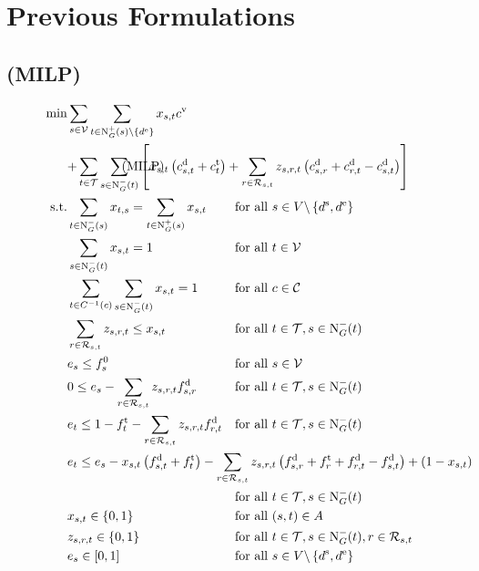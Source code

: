 \chapter{Previous Formulations}

\section{(MILP)}

\begin{align}
	\min & \sum_{s\in\mathcal{V}} \sum_{t\in\Nout(s)\backslash\{d^{\operatorname{e}}\}} x_{s,t}\cv \nonumber \\
	& \omit\rlap{$\displaystyle{ + \sum_{t\in\mathcal{T}} \sum_{s\in\Nin(t)} \left[x_{s,t}\left(\cd_{s,t}+\ct_{t}\right) + \sum_{r\in\Rst} z_{s,r,t}\left(\cd_{s,r}+\cd_{r,t}-\cd_{s,t}\right)\right]}$} \tag{MILP} \label{eq:MILP} \\
	\text{s.t.} & \sum_{t\in\Nin(s)} x_{t,s} = \sum_{t\in\Nout(s)} x_{s,t} & & \text{for all } s\in V\backslash\left\{d^{\operatorname{s}},d^{\operatorname{e}}\right\} \label{eq:MILP:flow} \\
	& \sum_{s\in\Nin(t)} x_{s,t} = 1 & & \text{for all } t\in\mathcal{V} \label{eq:MILP:vehicles} \\
	& \sum_{t\in C^{-1}(c)} \sum_{s\in\Nin(t)} x_{s,t} = 1 & & \text{for all } c\in\mathcal{C} \label{eq:MILP:customer} \\
	& \sum_{r\in\Rst} z_{s,r,t} \leq x_{s,t} & & \text{for all } t\in\mathcal{T}, s\in\Nin(t) \label{eq:MILP:refuel} \\
	& e_s \leq f_s^0 & & \text{for all } s\in\mathcal{V} \label{eq:MILP:initial_fuel} \\
	& 0 \leq e_s - \sum_{r\in\Rst} z_{s,r,t}\fd_{s,r} & & \text{for all } t\in\mathcal{T}, s\in\Nin(t) \label{eq:MILP:min_fuel} \\
	& e_t \leq 1 - \ft_t - \sum_{r\in\Rst} z_{s,r,t}\fd_{r,t} & & \text{for all } t\in\mathcal{T}, s\in\Nin(t) \label{eq:MILP:max_fuel} \\
	& \omit\rlap{$\displaystyle{e_t \leq e_s - x_{s,t}\left(f_{s,t}^{\operatorname{d}}+f_t^{\operatorname{t}}\right) - \sum_{r\in\Rst} z_{s,r,t}\left(\fd_{s,r}+\ft_r+\fd_{r,t}-\fd_{s,t}\right) + \left(1-x_{s,t}\right)}$} \nonumber \\
	& & & \text{for all } t\in\mathcal{T}, s\in\Nin(t) \label{eq:MILP:fuel_consumption} \\
	& x_{s,t}\in\{0,1\} & & \text{for all } (s,t)\in A \label{eq:MILP:xst} \\
	& z_{s,r,t}\in\{0,1\} & & \text{for all } t\in\mathcal{T},s\in\Nin(t),r\in\Rst \label{eq:MILP:zsrt} \\
	& e_s\in[0,1] & & \text{for all } s\in V\backslash\left\{d^{\operatorname{s}},d^{\operatorname{e}}\right\} \label{eq:MILP:es}
\end{align}

